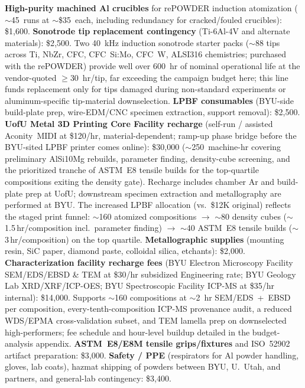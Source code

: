 \documentclass[11pt,letterpaper]{article}
\begin{document}
\textbf{High-purity machined Al crucibles} for rePOWDER induction atomization
($\sim$45~runs at $\sim$\$35~each, including redundancy for cracked/fouled
crucibles): \$1{,}600.
\textbf{Sonotrode tip replacement contingency} (Ti-6Al-4V and alternate
materials): \$2{,}500.  Two 40~kHz induction sonotrode starter packs
(${\sim}88$ tips across Ti, NbZr, CFC, CFC~Si:Mo, CFC~W, ALSI316 chemistries;
purchased with the rePOWDER) provide well over 600~hr of nominal
operational life at the vendor-quoted $\geq$30~hr/tip, far exceeding
the campaign budget here; this line funds replacement only for tips
damaged during non-standard experiments or aluminum-specific tip-material
downselection.
\textbf{LPBF consumables} (BYU-side build-plate prep, wire-EDM/CNC specimen
extraction, support removal): \$2{,}500.
\textbf{UofU Metal 3D Printing Core Facility recharge}
(self-run / assisted Aconity~MIDI at \$120/hr, material-dependent;
ramp-up phase bridge before the BYU-sited LPBF printer comes online):
\$30{,}000 ($\sim$250~machine-hr covering preliminary AlSi10Mg rebuilds,
parameter finding, density-cube screening, and the prioritized tranche
of ASTM~E8 tensile builds for the top-quartile compositions exiting the
density gate).  Recharge includes chamber Ar and build-plate prep at UofU;
downstream specimen extraction and metallography are performed at BYU.
The increased LPBF allocation (vs.\ \$12K original) reflects the staged
print funnel: $\sim$160 atomized compositions $\to$ $\sim$80 density
cubes ($\sim$1.5\,hr/composition incl.\ parameter finding) $\to$ $\sim$40
ASTM~E8 tensile builds ($\sim$3\,hr/composition) on the top quartile.
\textbf{Metallographic supplies} (mounting resin, SiC paper, diamond paste,
colloidal silica, etchants): \$2{,}000.
\textbf{Characterization facility recharge fees} (BYU Electron Microscopy
Facility SEM/EDS/EBSD \& TEM at \$30/hr subsidized Engineering rate; BYU
Geology Lab XRD/XRF/ICP-OES; BYU Spectroscopic Facility ICP-MS at \$35/hr
internal): \$14{,}000.  Supports $\sim$160 compositions at $\sim$2~hr
SEM/EDS~+~EBSD per composition, every-tenth-composition ICP-MS provenance
audit, a reduced WDS/EPMA cross-validation subset, and TEM lamella prep on
downselected high-performers; fee schedule and hour-level buildup detailed
in the budget-analysis appendix.
\textbf{ASTM~E8/E8M tensile grips/fixtures} and ISO~52902 artifact preparation:
\$3{,}000.
\textbf{Safety / PPE} (respirators for Al powder handling, gloves, lab coats),
hazmat shipping of powders between BYU, U.~Utah, and partners, and
general-lab contingency: \$3{,}400.
\end{document}
